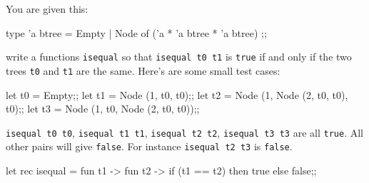 

\renewcommand\AUTHOR{nweadick1@cougars.ccis.edu} %


\topmattertwo


\nextq
You are given this:
\begin{console}[fontsize=\small]
type 'a btree = Empty
              | Node of ('a * 'a btree * 'a btree)
;;
\end{console}
write a functions \verb!isequal!
so that \verb!isequal t0 t1! is \verb!true! if and only if
the two trees \verb!t0! and \verb!t1! are the same.
Here's are some small test cases:
\begin{console}[fontsize=\small]
let t0 = Empty;;
let t1 = Node (1, t0, t0);;
let t2 = Node (1, Node (2, t0, t0), t0);;
let t3 = Node (1, t0, Node (2, t0, t0));; 
\end{console}
\verb!isequal t0 t0!,
\verb!isequal t1 t1!,
\verb!isequal t2 t2!,
\verb!isequal t3 t3! are all \verb!true!.
All other pairs will give \verb!false!.
For instance \verb!isequal t2 t3! is \verb!false!.
\\
\ANSWER
\begin{answercode}
    let rec isequal = fun t1 -> fun t2 -> if (t1 == t2) then true else false;;
\end{answercode}

\newpage


